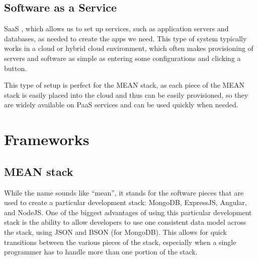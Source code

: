       \subsection{Software as a Service}
      \ac{SaaS} , which allows us to set up services, such as application servers and databases, as needed to create the apps we need. This type of system typically works in a cloud or hybrid cloud environment, which often makes provisioning of servers and software as simple as entering some configurations and clicking a button.
      
      This type of setup is perfect for the MEAN stack, as each piece of the MEAN stack is easily placed into the cloud and thus can be easily provisioned, so they are widely available on PaaS services and can be used quickly when needed.
      
\section{Frameworks}
\subsection*{MEAN stack}
While the name sounds like “mean”, it stands for the software pieces that are used to create a particular development stack: MongoDB, ExpressJS, Angular, and NodeJS. One of the biggest advantages of using this particular development stack is the ability to allow developers to use one consistent data model across the stack, using \ac{JSON} and BSON (for MongoDB). This allows for quick transitions between the various pieces of the stack, especially when a single programmer has to handle more than one portion of the stack.

